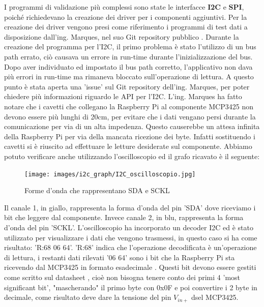 \documentclass[12pt, a4paper, titlepage, oneside]{book}
\begin{document}
I programmi di validazione più complessi sono state le interfacce \textbf{I2C} e \textbf{SPI}, poiché richiedevano la creazione dei driver per i componenti aggiuntivi.\newline
Per la creazione dei driver vengono presi come riferimento i programmi di test dati a disposizione dall'ing. Marques, nel suo Git repository pubblico \cite{asuol}.\newline
Durante la creazione del programma per l'I2C, il primo problema è stato l'utilizzo di un bus path errato, ciò causava un errore in run-time durante l'inizializzazione del bus. Dopo aver individuato ed impostato il bus path corretto, l'applicativo non dava più errori in run-time ma rimaneva bloccato sull'operazione di lettura.\newline
A questo punto è stata aperta una 'issue' sul Git repository dell'ing. Marques, per poter chiedere più informazioni riguardo le API per l'I2C. L'ing. Marques ha fatto notare che i cavetti che collegano la Raspberry Pi al componente MCP3425 non devono essere più lunghi di 20cm, per evitare che i dati vengano persi durante la comunicazione per via di un alta impedenza. Questo causerebbe un attesa infinita della Raspberry Pi per via della mancata ricezione dei byte. \newpage
Infatti sostituendo i cavetti si è riuscito ad effettuare le letture desiderate sul componente.\newline
Abbiamo potuto verificare anche utilizzando l'oscilloscopio ed il grafo ricavato è il seguente:\newline
\begin{figure}[h]
    \centering
    \texttt{[image: images/i2c\_graph/I2C\_oscilloscopio.jpg]}
    \caption{Forme d'onda che rappresentano SDA e SCKL}
    \label{fig:I2C_graPH}
\end{figure}
\newline
Il canale 1, in giallo, rappresenta la forma d'onda del pin 'SDA' dove riceviamo i bit che leggere dal componente.
Invece canale 2, in blu, rappresenta la forma d'onda del pin 'SCKL'.\newline
L'oscilloscopio ha incorporato un decoder I2C ed è stato utilizzato per visualizzare i dati che vengono trasmessi, in questo caso si ha come risultato: 'R:68 06 64'. \newline
'R:68' indica che l'operazione decodificata è un'operazione di lettura, i restanti dati rilevati '06 64' sono i bit che la Raspberry Pi sta ricevendo dal MCP3425 in formato esadecimale .\newline
Questi bit devono essere gestiti come scritto sul datasheet \cite{microchipMCP3425}, cioè non bisogna tenere conto dei primi 4 'most significant bit', "mascherando" il primo byte con 0x0F e poi convertire i 2 byte in decimale, come risultato deve dare la tensione del pin $V_{in+}$ dsel MCP3425.\newline
\end{document}
